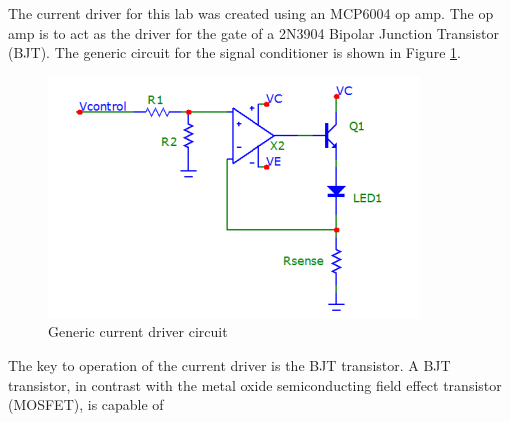 
The current driver for this lab was created using an MCP6004 op amp. The op amp is to act as the driver for the gate of a 2N3904 Bipolar Junction Transistor (BJT). The generic circuit for the signal conditioner is shown in Figure \ref{fig:currentgeneric}. 
	
	\begin{figure}[H]
		\centering
		\includegraphics[width=.6\textwidth]{CircuitDevelopment/ledgeneric.png}
		\caption{Generic current driver circuit \cite{b2}}
		\label{fig:currentgeneric}
	\end{figure}

The key to operation of the current driver is the BJT transistor. A BJT transistor, in contrast with the metal oxide semiconducting field effect transistor (MOSFET), is capable of 


